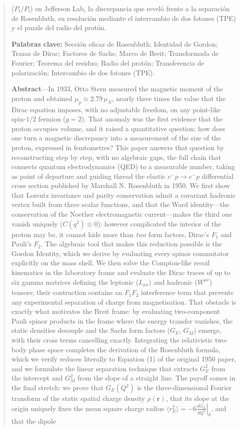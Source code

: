 \documentclass[10pt,a4paper]{article}
\begin{document}
\begin{quote}
($P_t/P_l$) en Jefferson Lab, la discrepancia que reveló frente a la separación de Rosenbluth, su resolución mediante el intercambio de dos fotones (TPE) y el puzzle del radio del protón.
\par\vspace{1ex}
\textbf{Palabras clave:} Sección eficaz de Rosenbluth; Identidad de Gordon; Trazas de Dirac; Factores de Sachs; Marco de Breit; Transformada de Fourier; Teorema del residuo; Radio del protón; Transferencia de polarización; Intercambio de dos fotones (TPE).
\par\vspace{1.5ex}
\textbf{Abstract}---In 1933, Otto Stern measured the magnetic moment of the proton and obtained $\mu_p \approx 2.79\,\mu_N$, nearly three times the value that the Dirac equation imposes, with no adjustable freedom, on any point-like spin-$1/2$ fermion ($g = 2$). That anomaly was the first evidence that the proton occupies volume, and it raised a quantitative question: how does one turn a magnetic discrepancy into a measurement of the size of the proton, expressed in femtometres? This paper answers that question by reconstructing step by step, with no algebraic gaps, the full chain that connects quantum electrodynamics (QED) to a measurable number, taking as point of departure and guiding thread the elastic $e^- p \to e^- p$ differential cross section published by Marshall N. Rosenbluth in 1950. We first show that Lorentz invariance and parity conservation admit a covariant hadronic vertex built from three scalar functions, and that the Ward identity---the conservation of the Noether electromagnetic current---makes the third one vanish uniquely ($C(q^2) \equiv 0$): however complicated the interior of the proton may be, it cannot hide more than \emph{two} form factors, Dirac's $F_1$ and Pauli's $F_2$. The algebraic tool that makes this reduction possible is the Gordon Identity, which we derive by evaluating every spinor commutator explicitly on the mass shell. We then solve the Compton-like recoil kinematics in the laboratory frame and evaluate the Dirac traces of up to six gamma matrices defining the leptonic ($L_{\mu\nu}$) and hadronic ($W^{\mu\nu}$) tensors; their contraction contains an $F_1 F_2$ interference term that prevents any experimental separation of charge from magnetisation. That obstacle is exactly what motivates the Breit frame: by evaluating two-component Pauli spinor products in the frame where the energy transfer vanishes, the static densities decouple and the Sachs form factors ($G_E$, $G_M$) emerge, with their cross terms cancelling exactly. Integrating the relativistic two-body phase space completes the derivation of the Rosenbluth formula, which we verify reduces literally to Equation (1) of the original 1950 paper, and we formulate the linear separation technique that extracts $G_E^2$ from the intercept and $G_M^2$ from the slope of a straight line. The payoff comes in the final stretch: we prove that $G_E(Q^2)$ is the three-dimensional Fourier transform of the static spatial charge density $\rho(\mathbf{r})$, that its slope at the origin uniquely fixes the mean square charge radius $\langle r_E^2 \rangle = -6 \left.\frac{dG_E}{dQ^2}\right|_0$, and that the dipole 
\end{quote}
\end{document}
